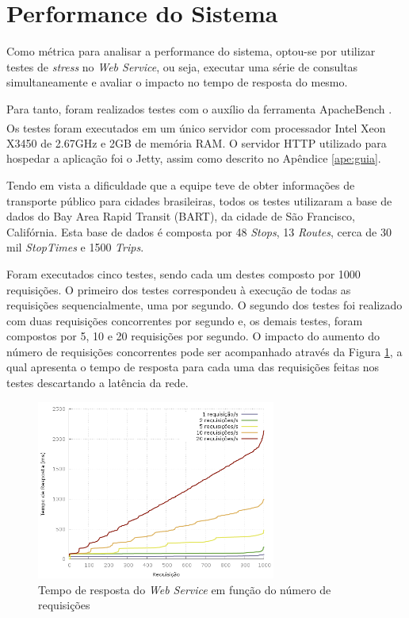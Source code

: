 \section{Performance do Sistema}

Como métrica para analisar a performance do sistema, optou-se por utilizar testes de \emph{stress} no \emph{Web Service}, ou seja, executar uma série de consultas simultaneamente e avaliar o impacto no tempo de resposta do mesmo.

Para tanto, foram realizados testes com o auxílio da ferramenta ApacheBench \cite{apachebench}.
Os testes foram executados em um único servidor com processador Intel{\textsuperscript\textregistered} Xeon{\textsuperscript\textregistered} X3450 de 2.67GHz e 2GB de memória RAM.
O servidor HTTP utilizado para hospedar a aplicação foi o Jetty, assim como descrito no Apêndice \ref{ape:guia}.

Tendo em vista a dificuldade que a equipe teve de obter informações de transporte público para cidades brasileiras, todos os testes utilizaram a base de dados do Bay Area Rapid Transit (BART), da cidade de São Francisco, Califórnia.
Esta base de dados é composta por 48 \emph{Stops}, 13 \emph{Routes}, cerca de 30 mil \emph{StopTimes} e 1500 \emph{Trips}.

Foram executados cinco testes, sendo cada um destes composto por 1000 requisições.
O primeiro dos testes correspondeu à execução de todas as requisições sequencialmente, uma por segundo.
O segundo dos testes foi realizado com duas requisições concorrentes por segundo e, os demais testes, foram compostos por 5, 10 e 20 requisições por segundo.
O impacto do aumento do número de requisições concorrentes pode ser acompanhado através da Figura \ref{fig:response}, a qual apresenta o tempo de resposta para cada uma das requisições feitas nos testes descartando a latência da rede.

\begin{figure}[!htb]
	\centering
	\includegraphics[width=0.7\textwidth]{./plots/stresstests/out.png}
	\caption[Tempo de resposta do \emph{Web Service}]{Tempo de resposta do \emph{Web Service} em função do número de requisições}
	\label{fig:response}
\end{figure}

